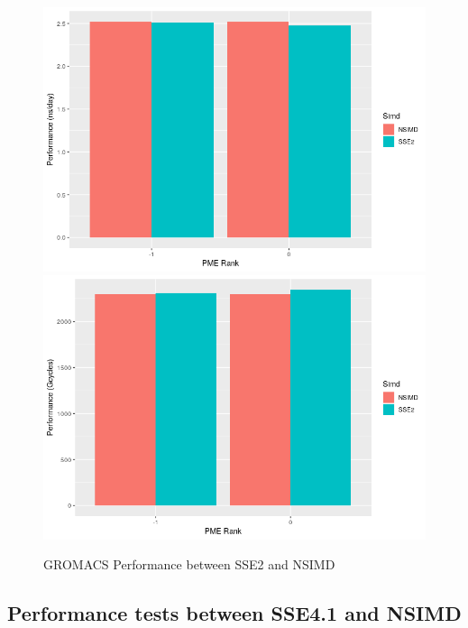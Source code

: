 \begin{figure}[!h]
\centering
        \includegraphics[scale=0.8]{SSE2.png}
        \includegraphics[scale=0.8]{SSE2_2.png}
        \caption{GROMACS Performance between SSE2 and NSIMD}
        \label{fg:f1}
\end{figure}
\newpage

\subsection{Performance tests between SSE4.1 and NSIMD}
